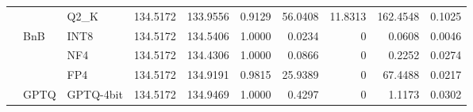 \begin{table}[t]
{\begin{tabular}{ll l rrrrrrr}
 &  & Q2\_K & 134.5172 & 133.9556 & \cellcolor{red!18} 0.9129 & \cellcolor{red!18} 56.0408 & 11.8313 & \cellcolor{red!18} 162.4548 & \cellcolor{red!18} 0.1025 \\
 & BnB & INT8 & 134.5172 & 134.5406 & 1.0000 & 0.0234 & \cellcolor{cyan!12} $0$ & 0.0608 & 0.0046 \\
 &  & NF4 & 134.5172 & 134.4306 & 1.0000 & 0.0866 & \cellcolor{cyan!12} $0$ & 0.2252 & 0.0274 \\
 &  & FP4 & 134.5172 & 134.9191 & 0.9815 & 25.9389 & \cellcolor{cyan!12} $0$ & 67.4488 & 0.0217 \\
 & GPTQ & GPTQ-4bit & 134.5172 & 134.9469 & 1.0000 & 0.4297 & \cellcolor{cyan!12} $0$ & 1.1173 & 0.0302 \\
\bottomrule
\end{tabular}}
\end{table}